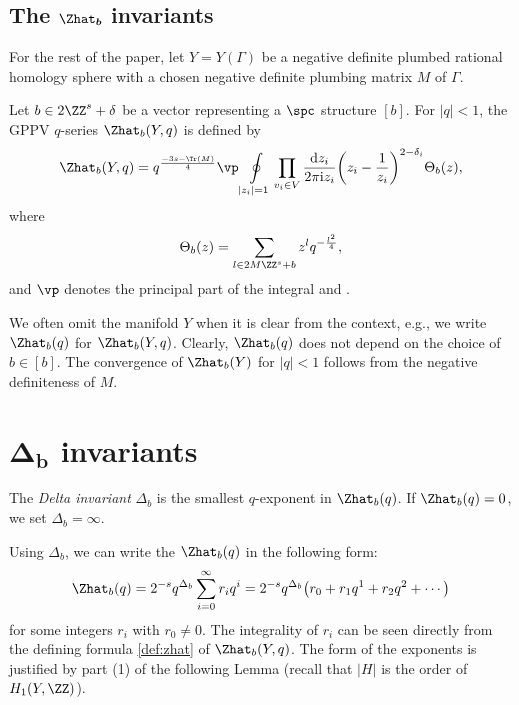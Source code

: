 \documentclass[pdftex]{sigma}
\begin{document}
\subsection[The Zhat\_b invariants]{The $\boldsymbol{\Zhat_b}$ invariants}

For the rest of the paper, let $Y = Y(\Gamma)$ be a negative definite plumbed rational homology sphere with a chosen negative definite plumbing matrix $M$ of $\Gamma$.

\begin{Definition}
Let $b \in 2\ZZ^s + \delta$ be a vector representing a $\spc$ structure $[b]$. For $\lvert q \rvert<1$, the GPPV $q$-series $\Zhat_b(Y,q)$ is defined by
\begin{equation}\label{def:zhat}
 \Zhat_b(Y,q) = q^{\frac{-3s - \Tr(M)}{4}} \vp\oint\limits_{\lvert z_i \rvert = 1}\prod_{v_i\in V} \frac{{\rm d}z_i}{2\pi {\rm i} z_i} \biggl(z_i - \frac{1}{z_i}\biggr)^{2-\delta_i} \Theta_{b}(z),
\end{equation}
where
\begin{equation}\label{eq:theta}
 \Theta_{b}(z) = \sum_{l \in 2M\ZZ^s + b} z^l q^{-\frac{l^2}{4}},
\end{equation}
and $\vp$ denotes the principal part of the integral and .
\end{Definition}

We often omit the manifold $Y$ when it is clear from the context, e.g., we write~$\Zhat_b(q)$ for $\Zhat_b(Y,q)$. Clearly, $\Zhat_b(q)$ does not depend on the choice of $b \in [b]$. The convergence of $\Zhat_b(Y)$ for $\lvert q \rvert<1$ follows from the negative definiteness of $M$.

\section[Delta\_b invariants]{$\boldsymbol{\Delta_b}$ invariants}

\begin{Definition}
The \emph{Delta invariant} $\Delta_b$ is the smallest $q$-exponent in $\Zhat_b(q)$. If $\Zhat_b(q) = 0$, we set $\Delta_b = \infty$.
\end{Definition}

Using $\Delta_b$, we can write the $\Zhat_b(q)$ in the following form:
\[
 \Zhat_b(q) = 2^{-s} q^{\Delta_b}\sum_{i=0}^\infty r_iq^i = 2^{-s} q^{\Delta_b}\bigl(r_0 + r_1q^1 + r_2q^2 + \cdots\bigr)
\]
for some integers $r_i$ with $r_0 \neq 0$. The integrality of $r_i$ can be seen directly from the defining formula \eqref{def:zhat} of $\Zhat_b(Y,q)$. The form of the exponents is justified by part (1) of the following Lemma (recall that $\lvert H\rvert$ is the order of $H_1(Y,\ZZ)$).
\end{document}
